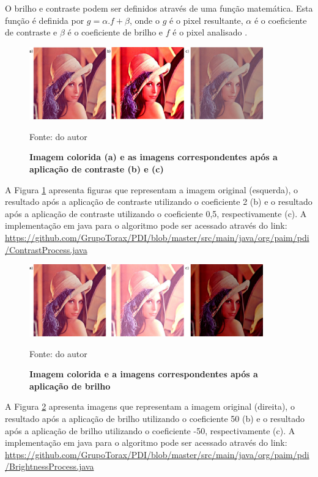 \documentclass[
	12pt,				%
	oneside,			%
	a4paper,			%
	english,			%
	french,				%
	spanish,			%
	brazil,				%
	]{abntex2}
\begin{document}
O brilho e contraste podem ser definidos através de uma função matemática. Esta função é definida por \(g = \alpha.f + \beta\), onde o \(g\) é o pixel resultante, \(\alpha\) é o coeficiente de contraste e \(\beta\) é o coeficiente de brilho e \(f\) é o pixel analisado \cite{pedriniSchwartz:2008}.

\begin{figure}[ht]
\centering
\caption{\textbf{Imagem colorida (a) e as imagens correspondentes após a aplicação de contraste (b) e (c)}}
\includegraphics[width=0.9\textwidth]{imagens/contraste.png}

Fonte: do autor
\label{fig:contraste}
\end{figure}

A Figura \ref{fig:contraste} apresenta figuras que representam a imagem original (esquerda), o resultado após a aplicação de contraste utilizando o coeficiente 2 (b) e o resultado após a aplicação de contraste utilizando o coeficiente 0,5, respectivamente (c). A implementação em java para o algoritmo pode ser acessado através do link: \url{https://github.com/GrupoTorax/PDI/blob/master/src/main/java/org/paim/pdi/ContrastProcess.java}

\begin{figure}[ht]
\centering
\caption{\textbf{Imagem colorida e a imagens correspondentes após a aplicação de brilho}}
\includegraphics[width=0.9\textwidth]{imagens/brilho.png}

Fonte: do autor
\label{fig:brilho}
\end{figure}

A Figura \ref{fig:brilho} apresenta imagens que representam a imagem original (direita), o resultado após a aplicação de brilho utilizando o coeficiente 50 (b) e o resultado após a aplicação de brilho utilizando o coeficiente -50, respectivamente (c). A implementação em java para o algoritmo pode ser acessado através do link: \url{https://github.com/GrupoTorax/PDI/blob/master/src/main/java/org/paim/pdi/BrightnessProcess.java}
\end{document}
